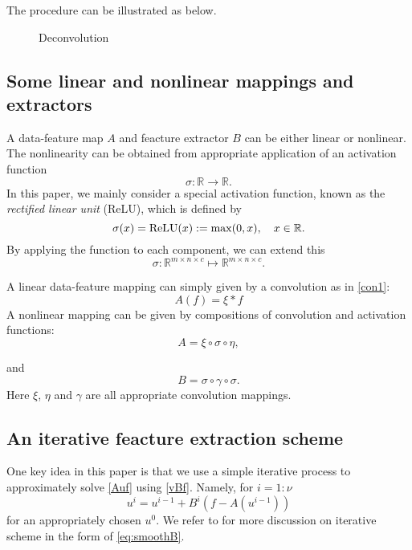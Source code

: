 The procedure can be illustrated as below.
\begin{figure}[htbp]
\caption{Deconvolution}
\end{figure}

\subsection{Some linear and nonlinear mappings and extractors}
A data-feature map $A$ and feacture extractor $B$ can be either
linear or nonlinear.   The nonlinearity can be obtained from
appropriate application of an activation function
\begin{equation}
\label{act}
\sigma: \mathbb{R} \to \mathbb{R} .
\end{equation}
In this paper, we mainly consider a special activation function, known 
as the {\it rectified linear unit} (ReLU), which is defined by
\begin{equation}
\label{relu}
\sigma(x)= {\rm ReLU}(x) :=\max(0,x), \quad x\in\mathbb{R}. 
\end{equation}
By applying the function to each component, we can extend this
\begin{equation}
\label{vector-act}
\sigma:\mathbb R^{m\times n\times c}\mapsto \mathbb R^{m\times n\times c}.  
\end{equation}


A linear data-feature mapping can simply given by a convolution as in \eqref{con1}:
\begin{equation}
\label{linearA}
A(f)=\xi\ast f
\end{equation}
A nonlinear mapping can be given by compositions of convolution and
activation functions:
\begin{equation}
\label{nonlinearA}
A=\xi\circ\sigma\circ\eta ,
\end{equation}

and 
\begin{equation}
\label{extractor}
B=\sigma\circ \gamma \circ\sigma  .
\end{equation}
Here $\xi$, $\eta$ and $\gamma$ are all 
appropriate convolution mappings.


\subsection{An iterative feacture extraction scheme}
One key idea in this paper is that we use a simple iterative
process to approximately solve \eqref{Auf} using \eqref{vBf}. Namely,
for $i=1:\nu$
\begin{equation}\label{eq:smoothB}
u^{i} = u^{i-1} + B^{i}(f- A(u^{i-1})) 
\end{equation}
for an appropriately chosen $u^0$.  We refer to \cite{xu1992iterative}
for more discussion on iterative scheme in the form of \eqref{eq:smoothB}.


